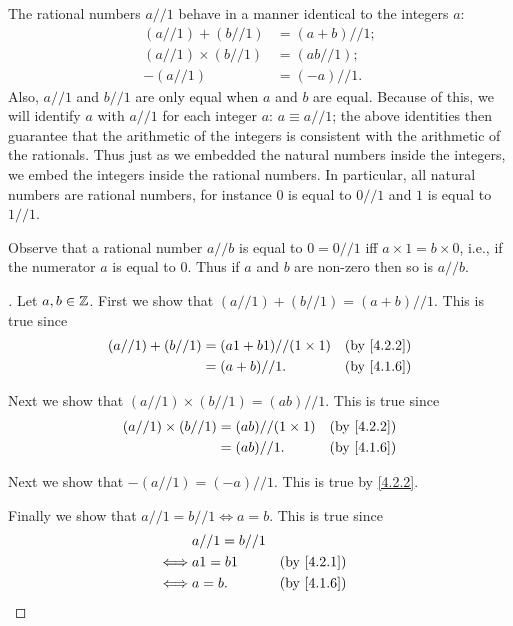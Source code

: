 \begin{ac}\label{ac:4.2.2}
  The rational numbers \(a // 1\) behave in a manner identical to the integers \(a\):
  \begin{align*}
    (a // 1) + (b // 1)      & = (a + b) // 1; \\
    (a // 1) \times (b // 1) & = (ab // 1);    \\
    -(a // 1)                & = (-a) // 1.
  \end{align*}
  Also, \(a // 1\) and \(b // 1\) are only equal when \(a\) and \(b\) are equal.
  Because of this, we will identify \(a\) with \(a // 1\) for each integer \(a\): \(a \equiv a // 1\);
  the above identities then guarantee that the arithmetic of the integers is consistent with the arithmetic of the rationals.
  Thus just as we embedded the natural numbers inside the integers, we embed the integers inside the rational numbers.
  In particular, all natural numbers are rational numbers, for instance \(0\) is equal to \(0 // 1\) and \(1\) is equal to \(1 // 1\).

  Observe that a rational number \(a // b\) is equal to \(0 = 0 // 1\) iff \(a \times 1 = b \times 0\), i.e., if the numerator \(a\) is equal to \(0\).
  Thus if \(a\) and \(b\) are non-zero then so is \(a // b\).
\end{ac}

\begin{proof}[]
  Let \(a, b \in \mathbb{Z}\).
  First we show that \((a // 1) + (b // 1) = (a + b) // 1\).
  This is true since
  \begin{align*}
    (a // 1) + (b // 1) & = (a1 + b1) // (1 \times 1) &  & \by{4.2.2} \\
                        & = (a + b) // 1.             &  & \by{4.1.6}
  \end{align*}

  Next we show that \((a // 1) \times (b // 1) = (ab) // 1\).
  This is true since
  \begin{align*}
    (a // 1) \times (b // 1) & = (ab) // (1 \times 1) &  & \by{4.2.2} \\
                             & = (ab) // 1.           &  & \by{4.1.6}
  \end{align*}

  Next we show that \(-(a // 1) = (-a) // 1\).
  This is true by \cref{4.2.2}.

  Finally we show that \(a // 1 = b // 1 \iff a = b\).
  This is true since
  \begin{align*}
         & a // 1 = b // 1                 \\
    \iff & a1 = b1         &  & \by{4.2.1} \\
    \iff & a = b.          &  & \by{4.1.6}
  \end{align*}
\end{proof}

